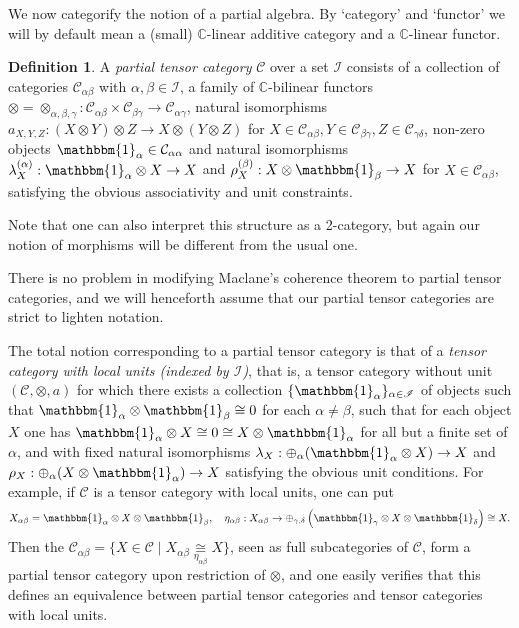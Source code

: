 \documentclass[10pt]{article}
\newcommand{\C}{\mathbb{C}}
\newcommand{\CatC}{\mathcal{C}}
\newcommand{\CatCC}{\mathscr{C}}
\newcommand{\Unitb}{\mathbbm{1}}
\theoremstyle{definition}
\newtheorem{Def}[Theorem]{Definition}
\numberwithin{equation}{section}
\begin{document}
We now categorify the notion of a partial algebra. By `category' and
`functor' we will by default mean a (small) $\C$-linear additive
category and a $\C$-linear functor. 

\begin{Def} A \emph{partial tensor category} $\CatCC$ over a set $\mathscr{I}$ consists of  a collection of categories $\mathcal{C}_{\alpha\beta}$ with $\alpha,\beta\in \mathscr{I}$, a family of $\C$-bilinear functors $\otimes = \otimes_{\alpha,\beta,\gamma}: \CatC_{\alpha\beta}\times \CatC_{\beta\gamma}\rightarrow \CatC_{\alpha\gamma}$, natural isomorphisms $a_{X,Y,Z}: (X\otimes Y)\otimes Z \rightarrow X\otimes (Y\otimes Z)$ for $X \in \CatC_{\alpha\beta},Y\in \CatC_{\beta\gamma},Z\in \CatC_{\gamma\delta}$, non-zero objects $\Unitb_{\alpha} \in \CatC_{\alpha\alpha}$ and natural isomorphisms $\lambda_X^{(\alpha)}:\Unitb_\alpha\otimes X \rightarrow X$ and $\rho_X^{(\beta)}:X\otimes \Unitb_\beta\rightarrow X$ for $X\in \CatC_{\alpha\beta}$, satisfying the obvious associativity and unit constraints. 
\end{Def}

Note that one can also interpret this structure as a 2-category, but again our notion of morphisms will be different from the usual one.

There is no problem in modifying Maclane's coherence theorem to partial tensor categories, and we will henceforth assume that our partial tensor categories are strict to lighten notation. 

The total notion corresponding to a partial tensor category is that of a \emph{tensor category with local units (indexed by $\mathscr{I}$)}, that is, a tensor category without unit $(\CatC,\otimes,a)$  for which there exists a collection $\{\Unitb_\alpha\}_{\alpha\in \mathscr{I}}$ of objects such that $\Unitb_\alpha\otimes \Unitb_\beta \cong 0$ for each $\alpha\neq \beta$, such that for each object $X$ one has $\Unitb_\alpha\otimes X \cong 0 \cong X\otimes \Unitb_\alpha$ for all but a finite set of $\alpha$, and with fixed natural isomorphisms $\lambda_X:\oplus_\alpha (\Unitb_\alpha\otimes X) \rightarrow X$ and $\rho_X:\oplus_\alpha(X\otimes \Unitb_\alpha)\rightarrow X$ satisfying the obvious unit conditions. For example, if $\CatC$ is a tensor category with local units, one can put \[X_{\alpha\beta} = \Unitb_\alpha\otimes X \otimes \Unitb_\beta, \quad \eta_{\alpha\beta}:X_{\alpha\beta} \rightarrow \oplus_{\gamma,\delta} \left(\Unitb_\gamma \otimes X \otimes \Unitb_\delta\right) \cong X.\]  Then the $\CatC_{\alpha\beta} = \{X \in \CatC\mid X_{\alpha\beta} \underset{\eta_{\alpha\beta}}{\cong} X\}$, seen as full subcategories of $\CatC$, form a partial tensor category upon restriction of $\otimes$, and one easily verifies that this defines an equivalence between partial tensor categories and tensor categories with local units. 
\end{document}
